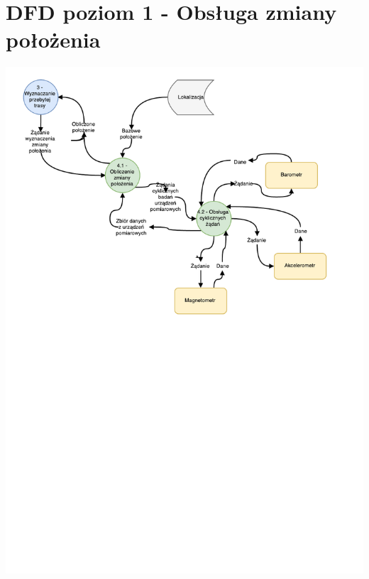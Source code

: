 \documentclass[11pt]{article}
\begin{document}
	\section{DFD poziom 1 - Obsługa zmiany położenia}
	\begin{center}
		\includegraphics[scale=0.8]{DFD4.pdf}
	\end{center}
	\newpage
\end{document}

